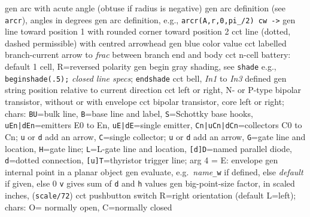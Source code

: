   {gen}
  {arc with acute angle (obtuse if radius is negative)}
  {gen}
  {arc definition (see {\tt arcr}), angles in degrees}
  {gen}
  {arc definition, e.g., {\tt arcr(A,r,0,pi\_/2) cw ->}}
  {gen}
  {line toward position 1 with rounded corner toward position 2}
  {cct}
  {line (dotted, dashed permissible) with centred arrowhead}
  {gen}
  {blue color value}
  {cct}
  {labelled branch-current arrow to {\sl frac} between branch end and body}
  {cct}
  {n-cell battery: default 1 cell,
  R=reversed polarity}
  {gen}
  {begin gray shading, see {\tt shade}
   e.g., {\tt beginshade(.5);} {\sl closed line specs}; {\tt endshade}}
  {cct}
  {bell, {\sl In1} to {\sl In3} defined}
  {gen}
  {string position relative to current direction}
  {cct}
  {left or right, N- or P-type bipolar transistor, without or with envelope }
  {cct}
  { bipolar transistor, core left or right; chars:
   {\tt BU}=bulk line,
   {\tt B}=base line and label,
   {\tt S}=Schottky base hooks,
   {\tt uEn|dEn}=emitters E0 to En,
   {\tt uE|dE}=single emitter,
   {\tt Cn|uCn|dCn}=collectors C0 to Cn; {\tt u} or {\tt d} add an arrow,
   {\tt C}=single collector; {\tt u} or {\tt d} add an arrow,
   {\tt G}=gate line and location,
   {\tt H}=gate line; {\tt L}=L-gate line and location,
   {\tt [d]D}=named parallel diode,
   {\tt d}=dotted connection,
   {\tt [u]T}=thyristor trigger line;
   arg 4 = E: envelope
   }
  {gen}
  {internal point in a planar object}
  {gen}
  {evaluate, e.g.\ {\sl name}{\tt \_w} if defined, else {\sl default\/}
   if given, else 0 {\tt v} gives sum of {\tt d} and {\tt h} values }
  {gen}
  {big-point-size factor, in scaled inches, ({\tt *scale/72})}
  {cct}
  {pushbutton switch R=right orientation (default L=left);
     chars: O= normally open, C=normally closed }
